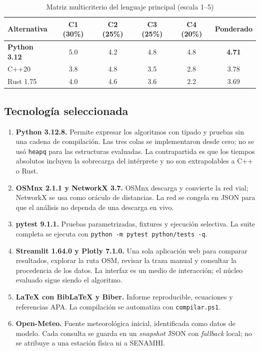 \begin{table}[H]
    \centering
    \fontsize{9.5}{11.5}\selectfont
    \renewcommand{\arraystretch}{1.15}
    \caption{Matriz multicriterio del lenguaje principal (escala 1--5)}
    \label{tab:matriz_multicriterio}
    \begin{tabularx}{\textwidth}{@{}>{\raggedright\arraybackslash}Xccccc@{}}
        \toprule
        \textbf{Alternativa} & \textbf{C1 (30\%)} & \textbf{C2 (25\%)} & \textbf{C3 (25\%)} & \textbf{C4 (20\%)} & \textbf{Ponderado} \\
        \midrule
        \textbf{Python 3.12} & 5.0 & 4.2 & 4.8 & 4.8 & \textbf{4.71} \\
        C++20 & 3.8 & 4.8 & 3.5 & 2.8 & 3.78 \\
        Rust 1.75 & 4.0 & 4.6 & 3.6 & 2.2 & 3.69 \\
        \bottomrule
    \end{tabularx}
\end{table}

\subsection{Tecnología seleccionada}
\begin{enumerate}
    \item \textbf{Python 3.12.8.} Permite expresar los algoritmos con tipado y pruebas sin una cadena de compilación. Las tres colas se implementaron desde cero; no se usó \texttt{heapq} para las estructuras evaluadas. La contrapartida es que los tiempos absolutos incluyen la sobrecarga del intérprete y no son extrapolables a C++ o Rust.
    \item \textbf{OSMnx 2.1.1 y NetworkX 3.7.} OSMnx descarga y convierte la red vial; NetworkX se usa como oráculo de distancias. La red se congela en JSON para que el análisis no dependa de una descarga en vivo.
    \item \textbf{pytest 9.1.1.} Pruebas parametrizadas, fixtures y ejecución selectiva. La suite completa se ejecuta con \texttt{python -m pytest python/tests -q}.
    \item \textbf{Streamlit 1.64.0 y Plotly 7.1.0.} Una sola aplicación web para comparar resultados, explorar la ruta OSM, revisar la traza manual y consultar la procedencia de los datos. La interfaz es un medio de interacción; el núcleo evaluado sigue siendo el algoritmo.
    \item \textbf{LaTeX con BibLaTeX y Biber.} Informe reproducible, ecuaciones y referencias APA. La compilación se automatiza con \texttt{compilar.ps1}.
    \item \textbf{Open-Meteo.} Fuente meteorológica inicial, identificada como datos de modelo. Cada consulta se guarda en un \textit{snapshot} JSON con \textit{fallback} local; no se atribuye a una estación física ni a SENAMHI.
\end{enumerate}

